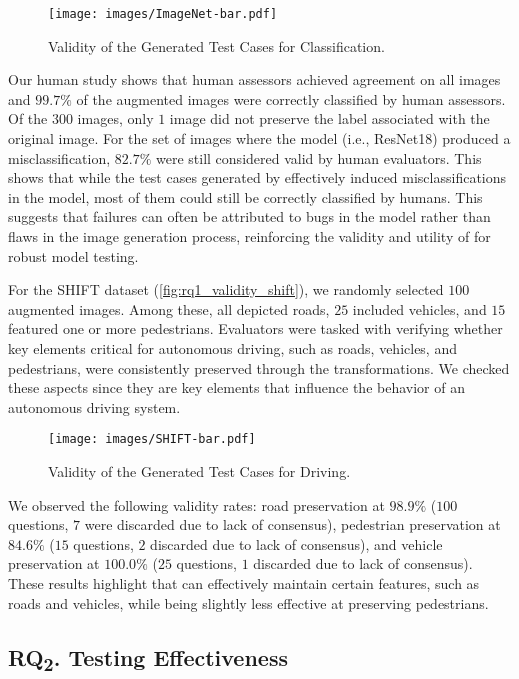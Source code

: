 \begin{figure}[h]
    \centering
    \texttt{[image: images/ImageNet-bar.pdf]}
    \caption{Validity of the Generated Test Cases for Classification.}
    \label{fig:rq1_validity_imagenet1k}
\end{figure}

Our human study shows that human assessors achieved agreement on all images and $99.7\%$ of the augmented images were correctly classified by human assessors. Of the $300$ images, only $1$ image did not preserve the label associated with the original image.
For the set of images where the model (i.e., ResNet18) produced a misclassification, $82.7\%$ were still considered valid by human evaluators. This shows that while the test cases generated by \approach effectively induced misclassifications in the model, most of them could still be correctly classified by humans. This suggests that failures can often be attributed to bugs in the model rather than flaws in the image generation process, reinforcing the validity and utility of \approach for robust model testing.

For the SHIFT dataset (\autoref{fig:rq1_validity_shift}), we randomly selected $100$ augmented images. Among these, all depicted roads, $25$ included vehicles, and $15$ featured one or more pedestrians. Evaluators were tasked with verifying whether key elements critical for autonomous driving, such as roads, vehicles, and pedestrians, were consistently preserved through the transformations.  We checked these aspects since they are key elements that influence the behavior of an autonomous driving system.

\begin{figure}[h]
    \centering
    \texttt{[image: images/SHIFT-bar.pdf]}
    \caption{Validity of the Generated Test Cases for Driving.}
    \label{fig:rq1_validity_shift}
\end{figure}

We observed the following validity rates: road preservation at $98.9\%$ ($100$ questions, $7$ were discarded due to lack of consensus), pedestrian preservation at $84.6\%$ ($15$ questions, $2$ discarded due to lack of consensus), and vehicle preservation at $100.0\%$ ($25$ questions, $1$ discarded due to lack of consensus). These results highlight that \approach can effectively maintain certain features, such as roads and vehicles, while being slightly less effective at preserving pedestrians.

\subsection{RQ\textsubscript{2}. Testing Effectiveness}

